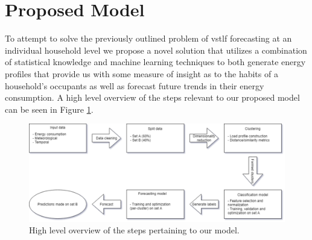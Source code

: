 \section{Proposed Model}
\label{sec:Introduction:Propose-Model}
To attempt to solve the previously outlined problem of \gls{vstlf} forecasting at an individual household level we propose a novel solution that utilizes a combination of statistical knowledge and machine learning techniques to both generate energy profiles that provide us with some measure of insight as to the habits of a household's occupants as well as forecast future trends in their energy consumption. A high level overview of the steps relevant to our proposed model can be seen in Figure \ref{fig:Proposed-Model-1}.

\null \vspace{0.5em}

\begin{figure}[H]
    \begin{adjustwidth}{-3.0cm}{-3.0cm}%
        \centering
        \includegraphics[width=\linewidth]{Images/Chapter 1/Other/High Level Model.pdf}
        \caption{High level overview of the steps pertaining to our model.}
        \label{fig:Proposed-Model-1}
    \end{adjustwidth}
\end{figure}

